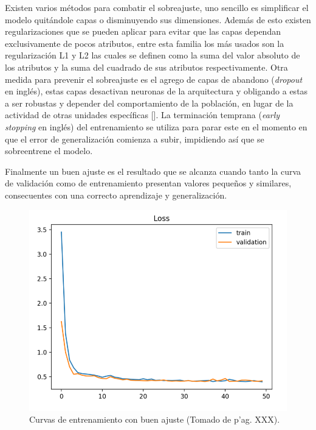 Existen varios métodos para combatir el sobreajuste, uno sencillo es simplificar el modelo quitándole capas 
o disminuyendo sus dimensiones. Además de esto existen regularizaciones que se pueden aplicar para evitar que 
las capas dependan exclusivamente de pocos atributos, entre esta familia los más usados son la regularización
L1 y L2 las cuales se definen como la suma del valor absoluto de los atributos y la suma del cuadrado de sus 
atributos respectivamente. Otra medida para prevenir el sobreajuste es el agrego de capas de abandono 
(\emph{dropout} en inglés), estas capas desactivan neuronas de la arquitectura y obligando a 
estas a ser robustas y depender del comportamiento de la población, en lugar de la actividad de otras unidades 
específicas [\cite{baldi2013dropout}]. La terminación temprana (\emph{early stopping} en inglés) del entrenamiento
se utiliza para parar este en el momento en que el error de generalización comienza a subir, impidiendo así que 
se sobreentrene el modelo.

Finalmente un buen ajuste es el resultado que se alcanza cuando tanto la curva de validación como de entrenamiento
presentan valores pequeños y similares, consecuentes con una correcto aprendizaje y generalización.

\begin{figure}[h!]
	\begin{center}
		\begin{center}
			\includegraphics[scale=.3]{Graphics/good_fit.png}
        \end{center}
	    \caption{Curvas de entrenamiento con buen ajuste (Tomado de \cite{brownlee2018better} p'ag. XXX).}\label{fig:god_fit}
	\end{center}
\end{figure}

